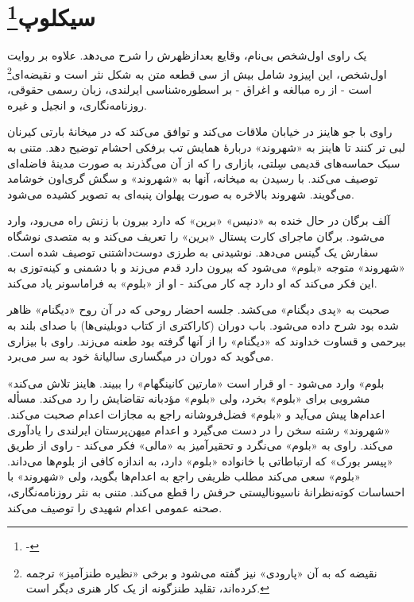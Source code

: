 \documentclass[12pt]{book}
\newcommand{\noun}[1]{«{#1}»}
\begin{document}
    \chapter[سیکلوپ]{سیکلوپ\protect\footnote{-}}\label{ep:12}
    یک راوی اول‌شخص بی‌نام، وقایع بعدازظهرش را شرح می‌دهد. علاوه بر روایت اول‌شخص، این اپیزود شامل بیش از سی قطعه متن به شکل نثر است و نقیضه‌ای\footnote{نقیضه که به آن «پارودی» نیز گفته می‌شود و برخی «نظیره طنزآمیز» ترجمه کرده‌اند، تقلید طنزگونه از یک کار هنری دیگر است.} است - از ره مبالغه و اغراق - بر اسطوره‌شناسی ایرلندی، زبان رسمی حقوقی، روزنامه‌نگاری، و انجیل و غیره.

    راوی با جو هاینز در خیابان ملاقات می‌کند و توافق می‌کند که در میخانۀ بارتی کیرنان لبی تر کنند تا هاینز به \noun{شهروند‬} دربارۀ همایش تب برفکی احشام توضیح دهد. متنی به سبک حماسه‌های قدیمی سِلتی، بازاری را که از آن می‌گذرند به صورت مدینۀ فاضله‌ای توصیف می‌کند. با رسیدن به میخانه، آنها به \noun{شهروند‬} و سگش گری‌اون خوشامد می‌گویند. شهروند بالاخره به صورت پهلوان پنبه‌ای به تصویر کشیده می‌شود.

    آلف برگان در حال خنده به \noun{دنیس} \noun{برین} که دارد بیرون با زنش راه می‌رود، وارد می‌شود. برگان ماجرای کارت پستال  \noun{برین} را تعریف می‌کند و به متصدی نوشگاه سفارش یک گینس می‌دهد. نوشیدنی به طرزی دوست‌داشتنی توصیف شده است. \noun{شهروند‬} متوجه \noun{بلوم} می‌شود که بیرون دارد قدم می‌زند و با دشمنی و کینه‌توزی به این فکر می‌کند که او دارد چه کار می‌کند - او از \noun{بلوم} به فراماسونر یاد می‌کند.

    صحبت به \noun{پدی دیگنام} می‌کشد. جلسه احضار روحی که در آن روح \noun{دیگنام} ظاهر شده بود شرح داده می‌شود. باب دوران (کاراکتری از کتاب دوبلینی‌ها) با صدای بلند به بیرحمی و قساوت خداوند که \noun{دیگنام} را از آنها گرفته بود طعنه می‌زند. راوی با بیزاری می‌گوید که دوران در میگساری سالیانۀ خود به سر می‌برد.

    \noun{بلوم} وارد می‌شود - او قرار است \noun{مارتین کانینگهام} را ببیند. هاینز تلاش می‌کند مشروبی برای \noun{بلوم} بخرد، ولی \noun{بلوم} مؤدبانه تقاضایش را رد می‌کند. مسأله اعدام‌ها پیش می‌آید و \noun{بلوم} فضل‌فروشانه راجع به مجازات اعدام صحبت می‌کند. \noun{شهروند‬} رشته سخن را در دست می‌گیرد و اعدام میهن‌پرستان ایرلندی را یادآوری می‌کند. راوی به \noun{بلوم} می‌نگرد و تحقیرآمیز به \noun{مالی} فکر می‌کند - راوی از طریق \noun{پیسر بورک} که ارتباطاتی با خانواده \noun{بلوم} دارد، به اندازه کافی از بلوم‌ها می‌داند. \noun{بلوم} سعی می‌کند مطلب ظریفی راجع به اعدام‌ها بگوید، ولی \noun{شهروند‬} با احساسات کوته‌نظرانۀ ناسیونالیستی حرفش را قطع می‌کند. متنی به نثر روزنامه‌نگاری، صحنه عمومی اعدام شهیدی را توصیف می‌کند.
\end{document}
